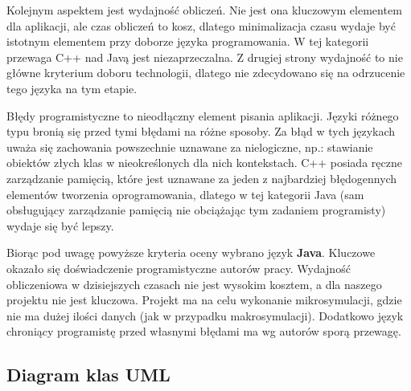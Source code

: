 \documentclass{sprawozdanie-agh}
\begin{document}
	Kolejnym aspektem jest wydajność obliczeń. Nie jest ona kluczowym elementem dla aplikacji, ale czas obliczeń to kosz, dlatego minimalizacja czasu wydaje być istotnym elementem przy doborze języka programowania. W tej kategorii przewaga C++ nad Javą jest niezaprzeczalna. Z drugiej strony wydajność to nie główne kryterium doboru technologii, dlatego nie zdecydowano się na odrzucenie tego języka na tym etapie.

	Błędy programistyczne to nieodłączny element pisania aplikacji. Języki różnego typu bronią się przed tymi błędami na różne sposoby. Za błąd w tych językach uważa się zachowania powszechnie uznawane za nielogiczne, np.: stawianie obiektów złych klas w nieokreślonych dla nich kontekstach. C++ posiada ręczne zarządzanie pamięcią, które jest uznawane za jeden z najbardziej błędogennych elementów tworzenia oprogramowania, dlatego w tej kategorii Java (sam obsługujący zarządzanie pamięcią nie obciążając tym zadaniem programisty) wydaje się być lepszy.

	Biorąc pod uwagę powyższe kryteria oceny wybrano język \textbf{Java}. Kluczowe okazało się doświadczenie programistyczne autorów pracy. Wydajność obliczeniowa w dzisiejszych czasach nie jest wysokim kosztem, a dla naszego projektu nie jest kluczowa. Projekt ma na celu wykonanie mikrosymulacji, gdzie nie ma dużej ilości danych (jak w przypadku makrosymulacji). Dodatkowo język chroniący programistę przed własnymi błędami ma wg autorów sporą przewagę.

	\subsection{Diagram klas UML}
\end{document}
